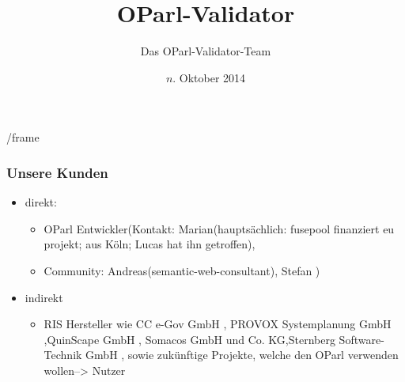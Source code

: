 \documentclass{beamer}
\title{OParl-Validator}
\author{Das OParl-Validator-Team}
\institute{Freie Universität Berlin\\Institut für Informatik}
\date{$n$. Oktober 2014}
\begin{document}
\frame{\titlepage}




/frame{
\frametitle{Unsere Kunden}
    \begin{itemize}[<+->]
        \item direkt: 
       		\begin{itemize}[<*>]
        		\item OParl Entwickler(Kontakt: Marian(hauptsächlich: fusepool finanziert eu projekt; aus Köln; Lucas hat ihn getroffen),
			\item Community:  Andreas(semantic-web-consultant), Stefan )
        	\end{itemize}
        \item indirekt
        	\begin{itemize}[<*>]
        		\item RIS Hersteller wie CC e-Gov GmbH , PROVOX Systemplanung GmbH ,QuinScape GmbH , Somacos GmbH und Co. KG,Sternberg Software-Technik GmbH ,
        			sowie zukünftige Projekte, welche den OParl verwenden wollen--> Nutzer 
      		\end{itemize}
      
    \end{itemize}


}
\end{document}

